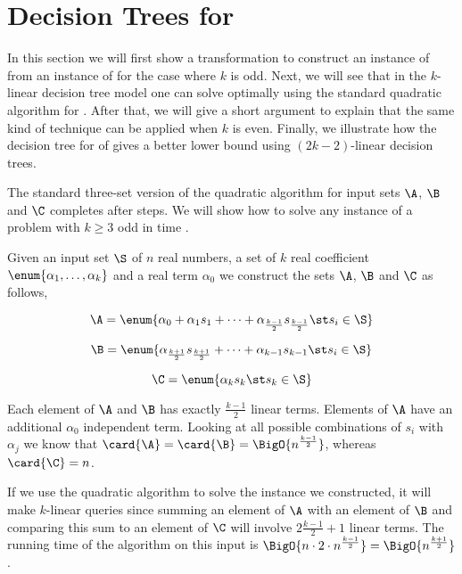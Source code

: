 \section{Decision Trees for \kLDT}
\label{tree:3sum:kldt}

In this section we will first show a transformation to construct an instance
of \threeSUM from an instance of \kLDT for the case where \(k\) is odd. Next, we will
see that in the \(k\)-linear decision tree model one can solve \kLDT optimally
using the standard quadratic algorithm for \threeSUM. After that, we will give a
short argument to explain that the same kind of technique can be applied when
\(k\) is even. Finally, we illustrate how the decision tree for \threeSUM of
\citet*{gronlund:2014} gives a better lower bound using \((2k-2)\)-linear
decision trees.

The standard three-set version of the quadratic \threeSUM algorithm for input
sets \(\A\), \(\B\) and \(\C\) completes after \BigO{\card{\C} ( \card{\A} +
\card{\B} ) } steps. We will show how to solve any instance of a \kLDT problem
with \(k \ge 3\) odd in time .

Given an input set \(\S\) of \(n\) real numbers, a set of \(k\) real
coefficient \( \enum{\alpha_1,\ldots,\alpha_k}\) and a real term \(\alpha_0\)
we construct the sets \(\A\), \(\B\) and \(\C\) as follows,

\begin{displaymath}
\A = \enum{\alpha_0 + \alpha_1 s_1 + \cdots + \alpha_{\frac{k-1}{2}} s_{\frac{k-1}{2}} \st s_i \in \S}
\end{displaymath}

\begin{displaymath}
\B = \enum{\alpha_{\frac{k+1}{2}} s_{\frac{k+1}{2}} + \cdots + \alpha_{k-1} s_{k-1} \st s_i \in \S}
\end{displaymath}

\begin{displaymath}
\C = \enum{\alpha_k s_k \st s_k \in \S}
\end{displaymath}

Each element of \(\A\) and \(\B\) has exactly \(\frac{k-1}{2}\) linear terms.
Elements of \(\A\) have an additional \(\alpha_0\) independent term. Looking
at all possible combinations of \(s_i\) with \(\alpha_j\) we know that
\(\card{\A} = \card{\B} = \BigO{n^{\frac{k-1}{2}}}\), whereas \(\card{\C} =
n\).

If we use the quadratic \threeSUM algorithm to solve the instance we
constructed, it will make \(k\)-linear queries since summing an element of
\(\A\) with an element of \(\B\) and comparing this sum to an element of
\(\C\) will involve \(2 \frac{k-1}{2} + 1\) linear terms. The running time of
the \threeSUM algorithm on this input is \(\BigO{n \cdot 2 \cdot n^{\frac{k-1}{2}}} =
\BigO{n^{\frac{k+1}{2}}}\).

